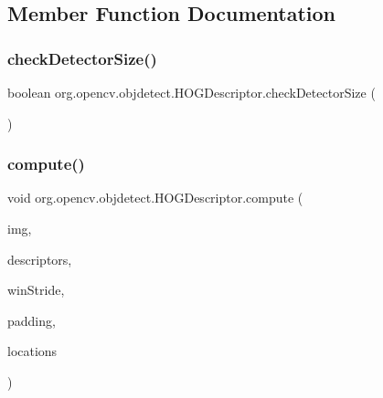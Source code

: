 \subsection{Member Function Documentation}
\mbox{\label{classorg_1_1opencv_1_1objdetect_1_1_h_o_g_descriptor_a6d9f493e4172ff68153f43f95aaabdba}} 
\subsubsection{\texorpdfstring{check\+Detector\+Size()}{checkDetectorSize()}}
{\footnotesize\ttfamily boolean org.\+opencv.\+objdetect.\+H\+O\+G\+Descriptor.\+check\+Detector\+Size (\begin{DoxyParamCaption}{ }\end{DoxyParamCaption})}

\mbox{\label{classorg_1_1opencv_1_1objdetect_1_1_h_o_g_descriptor_a2615b75d8e014bc7c751448c8b4fb653}} 
\subsubsection{\texorpdfstring{compute()}{compute()}\hspace{0.1cm}{\footnotesize\ttfamily [1/2]}}
{\footnotesize\ttfamily void org.\+opencv.\+objdetect.\+H\+O\+G\+Descriptor.\+compute (\begin{DoxyParamCaption}\item[{\mbox{\hyperlink{classorg_1_1opencv_1_1core_1_1_mat}{Mat}}}]{img,  }\item[{\mbox{\hyperlink{classorg_1_1opencv_1_1core_1_1_mat_of_float}{Mat\+Of\+Float}}}]{descriptors,  }\item[{\mbox{\hyperlink{classorg_1_1opencv_1_1core_1_1_size}{Size}}}]{win\+Stride,  }\item[{\mbox{\hyperlink{classorg_1_1opencv_1_1core_1_1_size}{Size}}}]{padding,  }\item[{\mbox{\hyperlink{classorg_1_1opencv_1_1core_1_1_mat_of_point}{Mat\+Of\+Point}}}]{locations }\end{DoxyParamCaption})}

